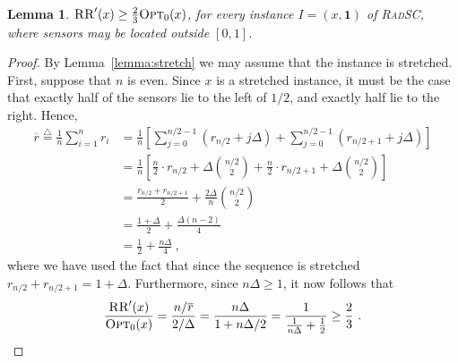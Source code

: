 \documentclass[11pt]{article}
\newtheorem{lemma}{Lemma}
\newcommand{\eqdf}{\stackrel{\scriptscriptstyle \triangle}{=}}
\newcommand{\inv}[1]{\frac{1}{#1}}
\newcommand{\srsc}{\textsc{RadSC}\xspace}
\newcommand{\RR}{\textsc{RR}\xspace}
\newcommand{\opt}{\textsc{Opt}\xspace}
\begin{document}
\begin{lemma}
\label{lemma:ratio}
$\RR'(x) \geq \frac{2}{3} \opt_0(x)$, for every instance $I =
(x,\mathbf{1})$ of \srsc, where sensors may be located outside
$[0,1]$.
\end{lemma}
\begin{proof}
By Lemma~\ref{lemma:stretch} we may assume that the instance is
stretched.  
First, suppose that $n$ is even.  Since $x$ is a stretched instance,
it must be the case that exactly half of the sensors lie to the left
of $1/2$, and exactly half lie to the right.
Hence,
\begin{align*}
\overline{r} 
\eqdf    \inv{n} \sum_{i=1}^n r_i 
& =    \inv{n} 
         \left[ \sum_{j=0}^{n/2-1} (r_{n/2} + j \Delta)  + 
                \sum_{j=0}^{n/2-1} (r_{n/2+1} + j \Delta) 
         \right] \\
& = \inv{n} 
       \left[ \frac{n}{2} \cdot r_{n/2} + \Delta \binom{n/2}{2} + 
              \frac{n}{2} \cdot r_{n/2+1} + \Delta \binom{n/2}{2} 
       \right] \\
& = \frac{r_{n/2} + r_{n/2+1}}{2} + \frac{2 \Delta}{n} \binom{n/2}{2} \\
& = \frac{1 + \Delta}{2} + \frac{\Delta (n-2)}{4} \\
& = \frac{1}{2} + \frac{n\Delta}{4}
~,
\end{align*}
where we have used the fact that since the sequence is stretched
$r_{n/2} + r_{n/2+1} = 1 + \Delta$.  Furthermore, since $n \Delta
\geq 1$, it now follows that
\[
\frac{\RR'(x)}{\opt_0(x)} 
=    \frac{n/\overline{r}}{2/\Delta} 
=	 \frac{n \Delta}{1 + n \Delta/2} 
=    \frac{1}{\frac{1}{n\Delta} + \frac{1}{2}} 
\geq \frac{2}{3} ~.
\]
		

\end{proof}
\end{document}
